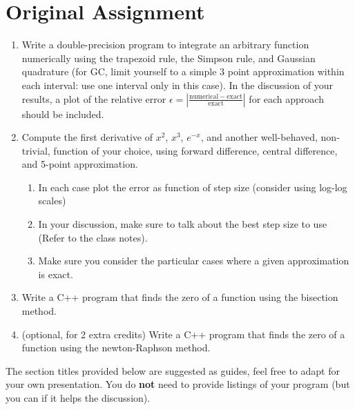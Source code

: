 \documentclass{report}
\begin{document}
\section{Original Assignment}
\begin{enumerate}
\item Write a double-precision program to integrate an arbitrary
  function numerically using the trapezoid rule, the Simpson rule, and
  Gaussian quadrature (for GC, limit yourself to a simple 3 point
  approximation within each interval: use one interval only in this case).  In the discussion of your
  results, a plot of the relative error $\epsilon =
  |\frac{\mathrm{numerical-exact}}{\mathrm{exact}}|$ for each approach should be included.
\item Compute the first derivative of $x^2$, $x^3$, $e^{-x}$, and
  another well-behaved, non-trivial, function of your choice, using
  forward difference, central difference, and 5-point approximation.
\begin{enumerate}
\item In each case plot the error as function of step size (consider using
  log-log scales)
\item In your discussion, make sure to talk about the best step size
  to use (Refer to the class notes).
  \item Make sure you consider the particular cases where a given approximation is exact. 
\end{enumerate}

\item Write a C++ program that finds the zero of a function using the bisection method. 
\item (optional, for 2 extra credits) Write a C++ program that finds the zero of a function using the newton-Raphson method. 
\end{enumerate}
The section titles provided below are suggested as guides, feel free to adapt for your own presentation. You do \textbf{not} need to provide listings of your program (but you can if it helps the discussion).
\end{document}
